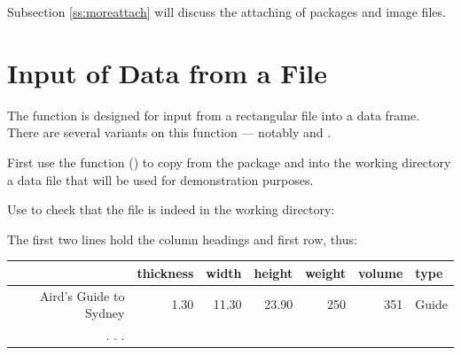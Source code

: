 Subsection \ref{ss:moreattach} will discuss the attaching of packages
and image files.

\section{Input of Data from a File}\label{sec:input}

The function  is designed for input from a
rectangular file into a data frame. There are several variants on this
function --- notably  and .

  First use the function 
() to copy from the  package and into the
working directory a data file that will be used for demonstration purposes.

\begin{knitrout}
\color{fgcolor}\begin{kframe}
\begin{alltt}
\hlopt{::}\hlstd{(}\hlstd{)}
\end{alltt}
\end{kframe}
\end{knitrout}
\noindent
Use  to check that the file is indeed in the working directory:
\begin{knitrout}
\color{fgcolor}\begin{kframe}
\begin{alltt}
\hlstd{(}\hlstd{=}\hlstd{)}
\end{alltt}
\end{kframe}
\end{knitrout}

The first two lines hold the column headings and first row, thus:\vspace*{9pt}

\noindent
{
\begin{tabular}{rrrrrrl}
\hline
 & thickness & width & height & weight & volume & type \\
\hline
Aird's Guide to Sydney & 1.30 & 11.30 & 23.90       & 250 &  351 &    Guide \\
. . .
\end{tabular}
}
\vspace*{3pt}

